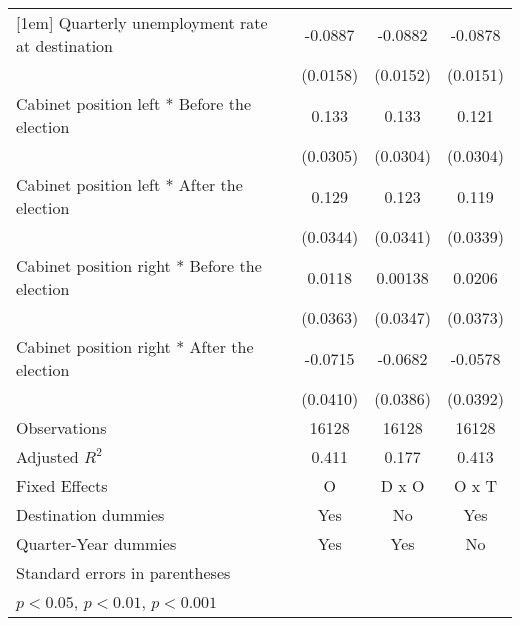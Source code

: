 \begin{table}[htbp]
\begin{tabular}{l*{3}{c}}
[1em]
Quarterly unemployment rate at destination&     -0.0887\sym{***}&     -0.0882\sym{***}&     -0.0878\sym{***}\\
                    &    (0.0158)         &    (0.0152)         &    (0.0151)         \\
[1em]
Cabinet position left * Before the election&       0.133\sym{***}&       0.133\sym{***}&       0.121\sym{***}\\
                    &    (0.0305)         &    (0.0304)         &    (0.0304)         \\
[1em]
Cabinet position left * After the election&       0.129\sym{***}&       0.123\sym{***}&       0.119\sym{***}\\
                    &    (0.0344)         &    (0.0341)         &    (0.0339)         \\
[1em]
Cabinet position right * Before the election&      0.0118         &     0.00138         &      0.0206         \\
                    &    (0.0363)         &    (0.0347)         &    (0.0373)         \\
[1em]
Cabinet position right * After the election&     -0.0715         &     -0.0682         &     -0.0578         \\
                    &    (0.0410)         &    (0.0386)         &    (0.0392)         \\
\hline
Observations        &       16128         &       16128         &       16128         \\
Adjusted \(R^{2}\)  &       0.411         &       0.177         &       0.413         \\
Fixed Effects       &           O         &       D x O         &       O x T         \\
Destination dummies &         Yes         &          No         &         Yes         \\
Quarter-Year dummies&         Yes         &         Yes         &          No         \\
\hline\hline
\multicolumn{4}{l}{\footnotesize Standard errors in parentheses}\\
\multicolumn{4}{l}{\footnotesize \sym{*} \(p<0.05\), \sym{**} \(p<0.01\), \sym{***} \(p<0.001\)}\\
\end{tabular}
\end{table}
